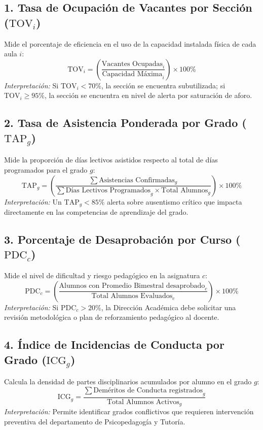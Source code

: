 \documentclass[12pt,a4paper,oneside]{report}
\begin{document}
    \subsection{1. Tasa de Ocupación de Vacantes por Sección ($\text{TOV}_i$)}
    Mide el porcentaje de eficiencia en el uso de la capacidad instalada física de cada aula $i$:
    \begin{equation}
    \text{TOV}_i = \left( \frac{\text{Vacantes Ocupadas}_i}{\text{Capacidad Máxima}_i} \right) \times 100\%
    \end{equation}
    \textit{Interpretación:} Si $\text{TOV}_i < 70\%$, la sección se encuentra subutilizada; si $\text{TOV}_i \ge 95\%$, la sección se encuentra en nivel de alerta por saturación de aforo.

    \subsection{2. Tasa de Asistencia Ponderada por Grado ($\text{TAP}_g$)}
    Mide la proporción de días lectivos asistidos respecto al total de días programados para el grado $g$:
    \begin{equation}
    \text{TAP}_g = \left( \frac{\sum \text{Asistencias Confirmadas}_g}{\sum \text{Días Lectivos Programados}_g \times \text{Total Alumnos}_g} \right) \times 100\%
    \end{equation}
    \textit{Interpretación:} Un $\text{TAP}_g < 85\%$ alerta sobre ausentismo crítico que impacta directamente en las competencias de aprendizaje del grado.

    \subsection{3. Porcentaje de Desaprobación por Curso ($\text{PDC}_c$)}
    Mide el nivel de dificultad y riesgo pedagógico en la asignatura $c$:
    \begin{equation}
    \text{PDC}_c = \left( \frac{\text{Alumnos con Promedio Bimestral desaprobado}_c}{\text{Total Alumnos Evaluados}_c} \right) \times 100\%
    \end{equation}
    \textit{Interpretación:} Si $\text{PDC}_c > 20\%$, la Dirección Académica debe solicitar una revisión metodológica o plan de reforzamiento pedagógico al docente.

    \subsection{4. Índice de Incidencias de Conducta por Grado ($\text{ICG}_g$)}
    Calcula la densidad de partes disciplinarios acumulados por alumno en el grado $g$:
    \begin{equation}
    \text{ICG}_g = \frac{\sum \text{Deméritos de Conducta registrados}_g}{\text{Total Alumnos Activos}_g}
    \end{equation}
    \textit{Interpretación:} Permite identificar grados conflictivos que requieren intervención preventiva del departamento de Psicopedagogía y Tutoría.
\end{document}
